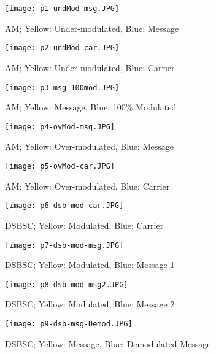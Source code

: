 \begin{figure}[H]
    \centering
    \begin{minipage}{0.45\linewidth}
        \centering
        \texttt{[image: p1-undMod-msg.JPG]}
        \caption{AM; Yellow: Under-modulated, Blue: Message}
        \label{fig:pic1}
    \end{minipage}
    \hfill
    \begin{minipage}{0.45\linewidth}
        \centering
        \texttt{[image: p2-undMod-car.JPG]}
        \caption{AM; Yellow: Under-modulated, Blue: Carrier}
        \label{fig:pic2}
    \end{minipage}
    \vspace{1em}
    \begin{minipage}{0.45\linewidth}
        \centering
        \texttt{[image: p3-msg-100mod.JPG]}
        \caption{AM; Yellow: Message, Blue: 100\% Modulated}
        \label{fig:pic3}
    \end{minipage}
    \hfill
    \begin{minipage}{0.45\linewidth}
        \centering
        \texttt{[image: p4-ovMod-msg.JPG]}
        \caption{AM; Yellow: Over-modulated, Blue: Message}
        \label{fig:pic4}
    \end{minipage}
    \vspace{1em}
    \begin{minipage}{0.45\linewidth}
        \centering
        \texttt{[image: p5-ovMod-car.JPG]}
        \caption{AM; Yellow: Over-modulated, Blue: Carrier}
        \label{fig:pic5}
    \end{minipage}
    \hfill
    \begin{minipage}{0.45\linewidth}
        \centering
        \texttt{[image: p6-dsb-mod-car.JPG]}
        \caption{DSB\-SC; Yellow: Modulated, Blue: Carrier}
        \label{fig:pic6}
    \end{minipage}
\end{figure}

\pagebreak

\begin{figure}[H]
    \centering
    \begin{minipage}{0.45\linewidth}
        \centering
        \texttt{[image: p7-dsb-mod-msg.JPG]}
        \caption{DSB\-SC; Yellow: Modulated, Blue: Message 1}
        \label{fig:pic7}
    \end{minipage}
    \hfill
    \begin{minipage}{0.45\linewidth}
        \centering
        \texttt{[image: p8-dsb-mod-msg2.JPG]}
        \caption{DSB\-SC; Yellow: Modulated, Blue: Message 2}
        \label{fig:pic8}
    \end{minipage}
    \vspace{1em}
    \begin{minipage}{\linewidth}
        \centering
        \texttt{[image: p9-dsb-msg-Demod.JPG]}
        \caption{DSB\-SC; Yellow: Message, Blue: Demodulated Message}
        \label{fig:pic9}
    \end{minipage}
\end{figure}
